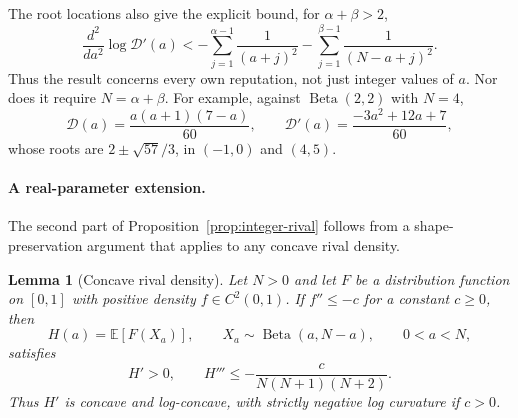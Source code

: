 \documentclass[11pt]{article}
\newcommand{\E}{\mathbb E}
\DeclareMathOperator{\Beta}{Beta}
\newtheorem{lemma}{Lemma}
\theoremstyle{definition}
\begin{document}
The root locations also give the explicit bound, for $\alpha+\beta>2$,
\begin{equation}\label{eq:integer-curvature-bound}
\frac{d^2}{da^2}\log\mathcal D'(a)
< -\sum_{j=1}^{\alpha-1}\frac{1}{(a+j)^2}
  -\sum_{j=1}^{\beta-1}\frac{1}{(N-a+j)^2}.
\end{equation}
Thus the result concerns every own reputation, not just integer values of
$a$. Nor does it require $N=\alpha+\beta$. For example, against
$\Beta(2,2)$ with $N=4$,
\begin{equation*}
\mathcal D(a)=\frac{a(a+1)(7-a)}{60},\qquad
\mathcal D'(a)=\frac{-3a^2+12a+7}{60},
\end{equation*}
whose roots are $2\pm\sqrt{57}/3$, in $(-1,0)$ and $(4,5)$.

\paragraph{A real-parameter extension.}
The second part of Proposition~\ref{prop:integer-rival} follows from a
shape-preservation argument that applies to any concave rival density.

\begin{lemma}[Concave rival density]\label{lem:concave-rival-density}
Let $N>0$ and let $F$ be a distribution function on $[0,1]$ with positive
density $f\in C^2(0,1)$. If $f''\leq-c$ for a constant $c\geq0$, then
\begin{equation*}
H(a)=\E[F(X_a)],\qquad X_a\sim\Beta(a,N-a),\qquad 0<a<N,
\end{equation*}
satisfies
\begin{equation}\label{eq:concave-density-bound}
H'>0,\qquad H'''\leq-\frac{c}{N(N+1)(N+2)}.
\end{equation}
Thus $H'$ is concave and log-concave, with strictly negative log curvature
if $c>0$.
\end{lemma}
\end{document}
